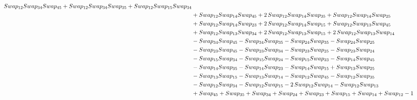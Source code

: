\documentclass[10pt,a4paper]{amsart}
\begin{document}
\begin{align*}
        \textnormal{Swap}_{12} \textnormal{Swap}_{34} \textnormal{Swap}_{45} + \textnormal{Swap}_{12} \textnormal{Swap}_{34} \textnormal{Swap}_{35} + \textnormal{Swap}_{12} \textnormal{Swap}_{15} \textnormal{Swap}_{34}\\ & + \textnormal{Swap}_{12} \textnormal{Swap}_{14} \textnormal{Swap}_{45} + 2\,\textnormal{Swap}_{12} \textnormal{Swap}_{14} \textnormal{Swap}_{35} +
        \textnormal{Swap}_{12} \textnormal{Swap}_{14} \textnormal{Swap}_{25}\\ & + \textnormal{Swap}_{12} \textnormal{Swap}_{14} \textnormal{Swap}_{23} + 2\,\textnormal{Swap}_{12} \textnormal{Swap}_{14} \textnormal{Swap}_{15} + \textnormal{Swap}_{12} \textnormal{Swap}_{13} \textnormal{Swap}_{45}\\ & + \textnormal{Swap}_{12} \textnormal{Swap}_{13} \textnormal{Swap}_{34} +
        2\,\textnormal{Swap}_{12} \textnormal{Swap}_{13} \textnormal{Swap}_{15} + 2\,\textnormal{Swap}_{12} \textnormal{Swap}_{13} \textnormal{Swap}_{14}\\ & - \textnormal{Swap}_{34} \textnormal{Swap}_{45} - \textnormal{Swap}_{34} \textnormal{Swap}_{35} - \textnormal{Swap}_{24} \textnormal{Swap}_{35} - \textnormal{Swap}_{24} \textnormal{Swap}_{25}\\ & -
        \textnormal{Swap}_{23} \textnormal{Swap}_{45} - \textnormal{Swap}_{23} \textnormal{Swap}_{34} - \textnormal{Swap}_{23} \textnormal{Swap}_{25} - \textnormal{Swap}_{23} \textnormal{Swap}_{24}\\ & - \textnormal{Swap}_{15} \textnormal{Swap}_{34} - \textnormal{Swap}_{15} \textnormal{Swap}_{24} - \textnormal{Swap}_{15} \textnormal{Swap}_{23} -
        \textnormal{Swap}_{14} \textnormal{Swap}_{45}\\ & - \textnormal{Swap}_{14} \textnormal{Swap}_{35} - \textnormal{Swap}_{14} \textnormal{Swap}_{23} - \textnormal{Swap}_{14} \textnormal{Swap}_{15} + \textnormal{Swap}_{13} \textnormal{Swap}_{25}\\ & - \textnormal{Swap}_{13} \textnormal{Swap}_{15} - \textnormal{Swap}_{13} \textnormal{Swap}_{14} -
        \textnormal{Swap}_{12} \textnormal{Swap}_{45} - \textnormal{Swap}_{12} \textnormal{Swap}_{35}\\ & - \textnormal{Swap}_{12} \textnormal{Swap}_{34} - \textnormal{Swap}_{12} \textnormal{Swap}_{15} - 2\,\textnormal{Swap}_{12} \textnormal{Swap}_{14} - \textnormal{Swap}_{12} \textnormal{Swap}_{13}\\ & + \textnormal{Swap}_{45} + \textnormal{Swap}_{35}
        + \textnormal{Swap}_{34} + \textnormal{Swap}_{24} + \textnormal{Swap}_{23} + \textnormal{Swap}_{15} + \textnormal{Swap}_{14} + \textnormal{Swap}_{12} - 1\\

\end{align*}
\end{document}
